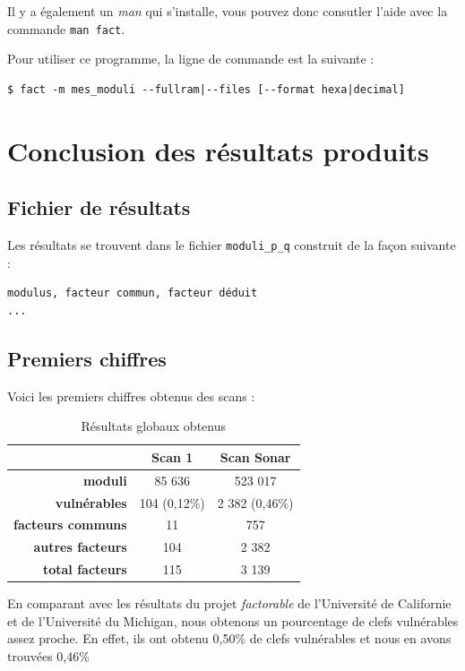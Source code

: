 Il y a également un \textit{man} qui s'installe, vous pouvez donc consutler l'aide avec la commande \verb+man fact+.

Pour utiliser ce programme, la ligne de commande est la suivante :
\begin{verbatim}
$ fact -m mes_moduli --fullram|--files [--format hexa|decimal]
\end{verbatim}


\section{Conclusion des résultats produits}

\subsection{Fichier de résultats}
Les résultats se trouvent dans le fichier \verb+moduli_p_q+ construit de la façon suivante :
\begin{verbatim}
modulus, facteur commun, facteur déduit
...
\end{verbatim}
\subsection{Premiers chiffres}
Voici les premiers chiffres obtenus des scans :


\begin{table}[H]
\centering
\begin{tabular}{|r|c|c|}
\hline
\textbf{}&\textbf{Scan 1}&\textbf{Scan Sonar}\\
\hline
\textbf{moduli}&85 636&523 017\\
\hline
\textbf{vulnérables}&104 (0,12\%)&2 382 (0,46\%)\\
\hline
\textbf{facteurs communs}&11&757\\
\hline
\textbf{autres facteurs}&104&2 382\\
\hline
\textbf{total facteurs}&115&3 139\\
\hline
\end{tabular}

\caption{Résultats globaux obtenus}
\label{res}
\end{table}

En comparant avec les résultats du projet \textit{factorable} de l'Université de Californie et de l'Université du Michigan, nous obtenons un pourcentage de clefs vulnérables assez proche. En effet, ils ont obtenu 0,50\% de clefs vulnérables et nous en avons trouvées 0,46\% \\


